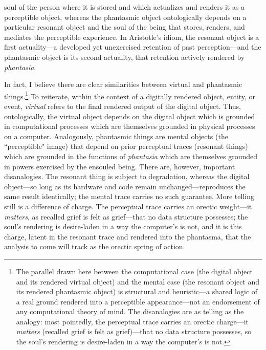 \documentclass{article}
\begin{document}
soul of the person where it is stored and which actualizes and renders it as a perceptible object, whereas the phantasmic object ontologically depends on a particular resonant object and the soul of the being that stores, renders, and mediates the perceptible experience. In Aristotle's idiom, the resonant object is a first actuality—a developed yet unexercised retention of past perception—and the phantasmic object is its second actuality, that retention actively rendered by \textit{phantasia}.

In fact, I believe there are clear similarities between virtual and phantasmic things.\footnote{The parallel drawn here between the computational case (the digital object and its rendered virtual object) and the mental case (the resonant object and its rendered phantasmic object) is structural and heuristic—a shared logic of a real ground rendered into a perceptible appearance—not an endorsement of any computational theory of mind. The disanalogies are as telling as the analogy: most pointedly, the perceptual trace carries an orectic charge—it \textit{matters} (recalled grief is felt as grief)—that no data structure possesses, so the soul's rendering is desire-laden in a way the computer's is not.} To reiterate, within the context of a digitally rendered object, entity, or event, \textit{virtual} refers to the final rendered output of the digital object. Thus, ontologically, the virtual object depends on the digital object which is grounded in computational processes which are themselves grounded in physical processes on a computer. Analogously, phantasmic things are mental objects (the “perceptible" image) that depend on prior perceptual traces (resonant things) which are grounded in the functions of \textit{phantasia} which are themselves grounded in powers exercised by the ensouled being. There are, however, important disanalogies. The resonant thing is subject to degradation, whereas the digital object—so long as its hardware and code remain unchanged—reproduces the same result identically; the mental trace carries no such guarantee. More telling still is a difference of charge. The perceptual trace carries an orectic weight—it \textit{matters}, as recalled grief is felt as grief—that no data structure possesses; the soul's rendering is desire-laden in a way the computer's is not, and it is this charge, latent in the resonant trace and rendered into the phantasma, that the analysis to come will track as the orectic spring of action.
\end{document}
